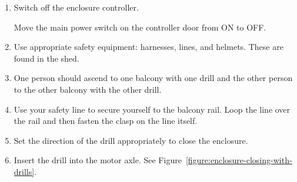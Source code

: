 \begin{enumerate}
\item Switch off the enclosure controller.

Move the main power switch on the controller door from ON to OFF.

%

%

%

%

%


\item
Use appropriate safety equipment: harnesses, lines, and helmets. These are found in the shed.

\item
One person should ascend to one balcony with one drill and the other person to the other balcony with the other drill.

\item
Use your safety line to secure yourself to the balcony rail. Loop the line over the rail and then fasten the clasp on the line itself.

\item
Set the direction of the drill appropriately to close the enclosure.

\item
Insert the drill into the motor axle. See Figure~\ref{figure:enclosure-closing-with-drills}.


\end{enumerate}
